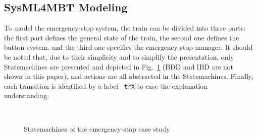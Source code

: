 \documentclass{llncs}
\begin{document}
\subsection{SysML4MBT Modeling}
\vspace*{-.1cm}
To model the emergency-stop system, the train can be divided into
three parts: the first part defines the general state of the train,
the second one defines the button system, and the third one specifies
the emergency-stop manager. It should be noted that, due to their
simplicity and to simplify the presentation, only Statemachines are 
presented and depicted in Fig.~\ref{trainStatemachine} (BDD and IBD
are not shown in this paper), and actions are all abstracted in the
Statemachines. Finally, each transition is identified by a label {\tt
  trX} to ease the explanation understanding.
\vspace*{-.5cm}
\begin{figure}[htp]
\\
\centerline{
  \vspace{-.3cm}}
\caption{Statemachines of the emergency-stop case study}
\label{trainStatemachine}
\end{figure}
\vspace{-.5cm}
\end{document}
